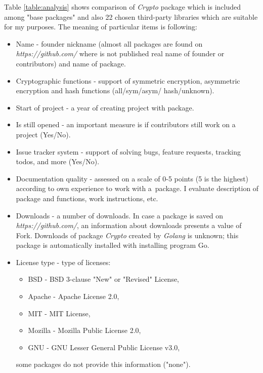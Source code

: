 \documentclass[
  12pt, 
  digital, %
  notable,   %
  nolof,     %
  nolot,     %
]{fithesis3}
\begin{document}
Table \ref{table:analysis} shows comparison of \textit{Crypto} package which is included among "base 
packages" and also 22 chosen third-party libraries which are suitable for my purposes. The meaning of particular items is following:
\begin{itemize}[leftmargin=2em,rightmargin=1em,itemsep=0.75\parskip,parsep=0em,topsep=0em,partopsep=0em]
\item Name - founder nickname (almost all packages are found on \textit{https://github.com/} where is not published real name of founder or contributors) and name of package.
\item Cryptographic functions - support of symmetric encryption, asymmetric encryption and hash functions (all/sym/asym/ hash/unknown).
\item Start of project - a year of creating project with package.
\item Is still opened - an important measure is if contributors still work on a project (Yes/No).
\item Issue tracker system - support of solving bugs, feature requests, tracking todos, and more (Yes/No).
\item Documentation quality - assessed on a scale of 0-5 points (5 is the highest) according to own experience to work with a~package. I evaluate description of package and functions, work instructions, etc.
\item Downloads - a number of downloads. In case a package is saved on \textit{https://github.com/}, an information about downloads presents a value of Fork. Downloads of package \textit{Crypto} created by \textit{Golang} is unknown; this package is automatically installed with installing program Go.  
\item License type - type of licenses:
\begin{itemize}[leftmargin=2em,rightmargin=1em,itemsep=0.75\parskip,parsep=0em,topsep=0em,partopsep=0em]
\item BSD - BSD 3-clause "New" or "Revised" License,
\item Apache - Apache License 2.0,
\item MIT - MIT License,
\item Mozilla - Mozilla Public License 2.0,
\item GNU - GNU Lesser General Public License v3.0,
\end{itemize}
some packages do not provide this information ("none").
\end{itemize}
\end{document}
